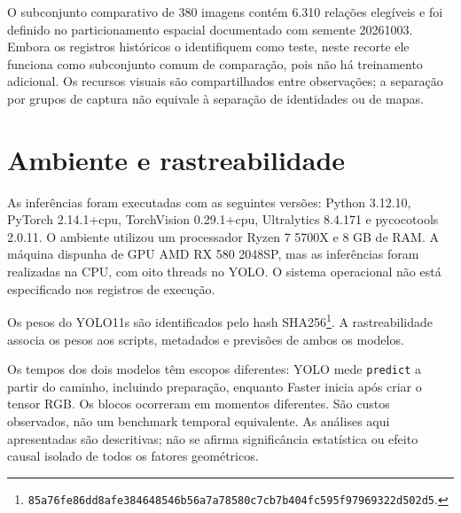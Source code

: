 O subconjunto comparativo de 380 imagens contém 6.310 relações elegíveis e foi definido no particionamento espacial documentado com semente 20261003. Embora os registros históricos o identifiquem como teste, neste recorte ele funciona como subconjunto comum de comparação, pois não há treinamento adicional. Os recursos visuais são compartilhados entre observações; a separação por grupos de captura não equivale à separação de identidades ou de mapas.

\section{Ambiente e rastreabilidade}
As inferências foram executadas com as seguintes versões: Python 3.12.10, PyTorch 2.14.1+cpu, TorchVision 0.29.1+cpu, Ultralytics 8.4.171 e pycocotools 2.0.11. O ambiente utilizou um processador Ryzen 7 5700X e 8 GB de RAM. A máquina dispunha de GPU AMD RX 580 2048SP, mas as inferências foram realizadas na CPU, com oito threads no YOLO. O sistema operacional não está especificado nos registros de execução.

Os pesos do YOLO11s são identificados pelo hash SHA256\footnote{\texttt{85a76fe86dd8afe384648546b56a7a78580c7cb7b404fc595f97969322d502d5}.}. A rastreabilidade associa os pesos aos scripts, metadados e previsões de ambos os modelos.

Os tempos dos dois modelos têm escopos diferentes: YOLO mede \texttt{predict} a partir do caminho, incluindo preparação, enquanto Faster inicia após criar o tensor RGB. Os blocos ocorreram em momentos diferentes. São custos observados, não um benchmark temporal equivalente. As análises aqui apresentadas são descritivas; não se afirma significância estatística ou efeito causal isolado de todos os fatores geométricos.

